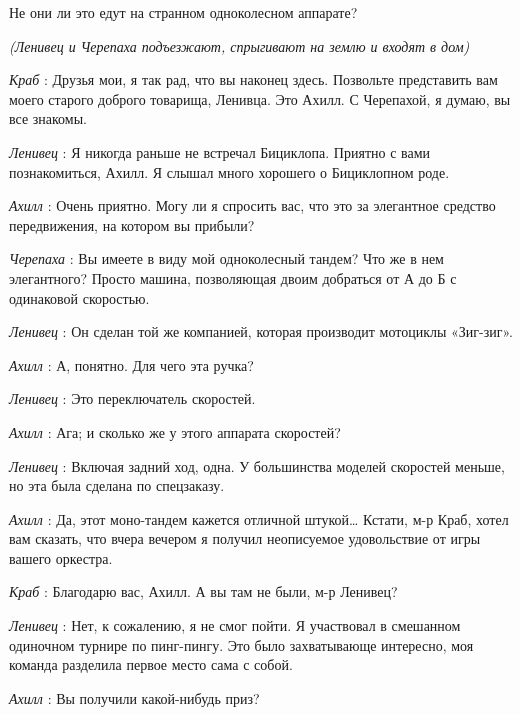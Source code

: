 \documentclass[../main.tex]{subfiles}
\begin{document}


\begin{dialogue}

 Не они ли это едут на странном одноколесном аппарате?

\emph{(Ленивец и Черепаха подъезжают, спрыгивают на землю и входят в дом)}

\emph{Краб} : Друзья мои, я так рад, что вы наконец здесь. Позвольте представить вам моего старого доброго товарища, Ленивца. Это Ахилл. С Черепахой, я думаю, вы все знакомы.

\emph{Ленивец} : Я никогда раньше не встречал Бициклопа. Приятно с вами познакомиться, Ахилл. Я слышал много хорошего о Бициклопном роде.

\emph{Ахилл} : Очень приятно. Могу ли я спросить вас, что это за элегантное средство передвижения, на котором вы прибыли?

\emph{Черепаха} : Вы имеете в виду мой одноколесный тандем? Что же в нем элегантного? Просто машина, позволяющая двоим добраться от А до Б с одинаковой скоростью.

\emph{Ленивец} : Он сделан той же компанией, которая производит мотоциклы «Зиг-зиг».

\emph{Ахилл} : А, понятно. Для чего эта ручка?

\emph{Ленивец} : Это переключатель скоростей.

\emph{Ахилл} : Ага; и сколько же у этого аппарата скоростей?

\emph{Ленивец} : Включая задний ход, одна. У большинства моделей скоростей меньше, но эта была сделана по спецзаказу.

\emph{Ахилл} : Да, этот моно-тандем кажется отличной штукой\ldots{} Кстати, м-р Краб, хотел вам сказать, что вчера вечером я получил неописуемое удовольствие от игры вашего оркестра.

\emph{Краб} : Благодарю вас, Ахилл. А вы там не были, м-р Ленивец?

\emph{Ленивец} : Нет, к сожалению, я не смог пойти. Я участвовал в смешанном одиночном турнире по пинг-пингу. Это было захватывающе интересно, моя команда разделила первое место сама с собой.

\emph{Ахилл} : Вы получили какой-нибудь приз?


\end{dialogue}
\end{document}
